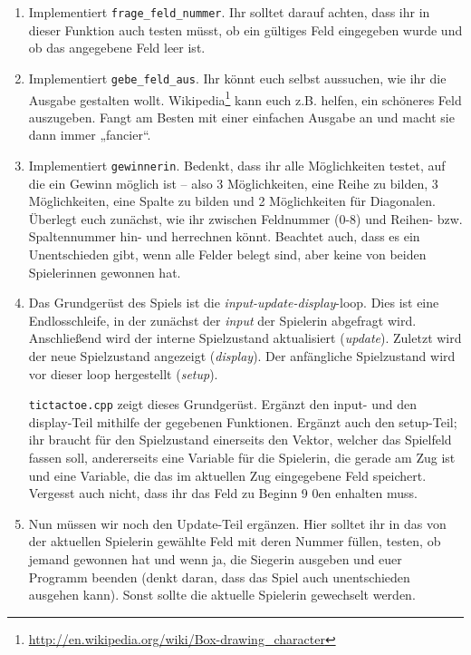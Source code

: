 \begin{praxis}
	\begin{enumerate}
    \item Implementiert \texttt{frage\_feld\_nummer}. Ihr solltet darauf
          achten, dass ihr in dieser Funktion auch testen müsst, ob ein gültiges
          Feld eingegeben wurde und ob das angegebene Feld leer ist.

    \item Implementiert \texttt{gebe\_feld\_aus}. Ihr könnt euch selbst
          aussuchen, wie ihr die Ausgabe gestalten wollt.
          Wikipedia\footnote{\url{http://en.wikipedia.org/wiki/Box-drawing_character}}
          kann euch z.B. helfen, ein schöneres Feld auszugeben. Fangt am Besten
          mit einer einfachen Ausgabe an und macht sie dann immer „fancier“.

    \item Implementiert \texttt{gewinnerin}. Bedenkt, dass ihr alle
          Möglichkeiten testet, auf die ein Gewinn möglich ist -- also 3
          Möglichkeiten, eine Reihe zu bilden, 3 Möglichkeiten, eine Spalte zu
          bilden und 2 Möglichkeiten für Diagonalen. Überlegt euch zunächst, wie
          ihr zwischen Feldnummer (0-8) und Reihen- bzw. Spaltennummer hin- und
          herrechnen könnt. Beachtet auch, dass es ein Unentschieden gibt, wenn
          alle Felder belegt sind, aber keine von beiden Spielerinnen gewonnen
          hat.
    \item
		      Das Grundgerüst des Spiels ist die \emph{input-update-display}-loop.
		      Dies ist eine Endlosschleife, in der zunächst der \emph{input} der Spielerin abgefragt wird.
		      Anschließend wird der interne Spielzustand aktualisiert (\emph{update}).
		      Zuletzt wird der neue Spielzustand angezeigt (\emph{display}).
		      Der anfängliche Spielzustand wird vor dieser loop hergestellt (\emph{setup}).

		      \texttt{tictactoe.cpp} zeigt dieses Grundgerüst.
		      Ergänzt den input- und den display-Teil mithilfe der gegebenen Funktionen.
		      Ergänzt auch den setup-Teil; ihr braucht für den Spielzustand einerseits den Vektor, welcher das Spielfeld fassen soll, andererseits eine Variable für die Spielerin, die gerade am Zug ist und eine Variable, die das im aktuellen Zug eingegebene Feld speichert.
		      Vergesst auch nicht, dass ihr das Feld zu Beginn 9 0en enhalten muss.
		\item
		      Nun müssen wir noch den Update-Teil ergänzen.
		      Hier solltet ihr in das von der aktuellen Spielerin gewählte Feld mit deren Nummer füllen, testen, ob jemand gewonnen hat und wenn ja, die Siegerin ausgeben und euer Programm beenden (denkt daran, dass das Spiel auch unentschieden ausgehen kann).
		      Sonst sollte die aktuelle Spielerin gewechselt werden.
	\end{enumerate}
\end{praxis}

